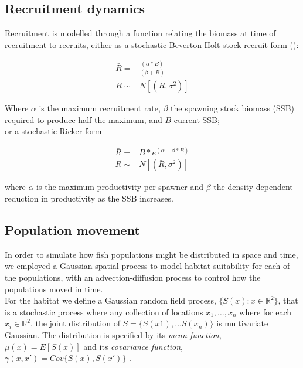 \documentclass[review]{elsarticle}
\begin{document}
\subsection{Recruitment dynamics}

Recruitment is modelled through a function relating the biomass at time of
recruitment to recruits, either as a stochastic Beverton-Holt stock-recruit
form (\cite{Beverton1957}): 

\begin{equation*}
	\begin{split}
	\bar{R} = & \frac{(\alpha * B)}{(\beta + B)} \\
	     R \sim & N[(\bar{R},\sigma^2)]
	\end{split}
\end{equation*}

Where $\alpha$ is the maximum recruitment rate, $\beta$ the spawning stock
biomass (SSB) required to produce half the maximum, and $B$ current SSB; \\

or a stochastic Ricker form \cite{Ricker1954}

\begin{equation*}
	\begin{split}
	\bar{R} = & B * e^{(\alpha - \beta * B)} \\	
   	     R \sim & N[(\bar{R},\sigma^2)]
	\end{split}
\end{equation*}

where $\alpha$ is the maximum productivity per spawner and $\beta$ the density
dependent reduction in productivity as the SSB increases.

\subsection{Population movement}

In order to simulate how fish populations might be distributed in space and
time, we employed a Gaussian spatial process to model habitat suitability for
each of the populations, with an advection-diffusion process to control how the
populations moved in time. \\

For the habitat we define a Gaussian random field process, $\{S(x) : x \in
\mathbb{R}^2\}$, that is a stochastic process where any collection of locations
$x_{1}, \dots, x_{n}$ where for each $x_{i} \in \mathbb{R}^2$, the joint
distribution of $S = \{S(x1),\dots S(x_{n})\}$ is multivariate Gaussian. The
distribution is specified by its \textit{mean function}, $\mu(x) = E[S(x)]$ and
its \textit{covariance function}, $\gamma(x,x') = Cov\{S(x),S(x')\}$
\cite{Diggle2007}.\\
\end{document}
